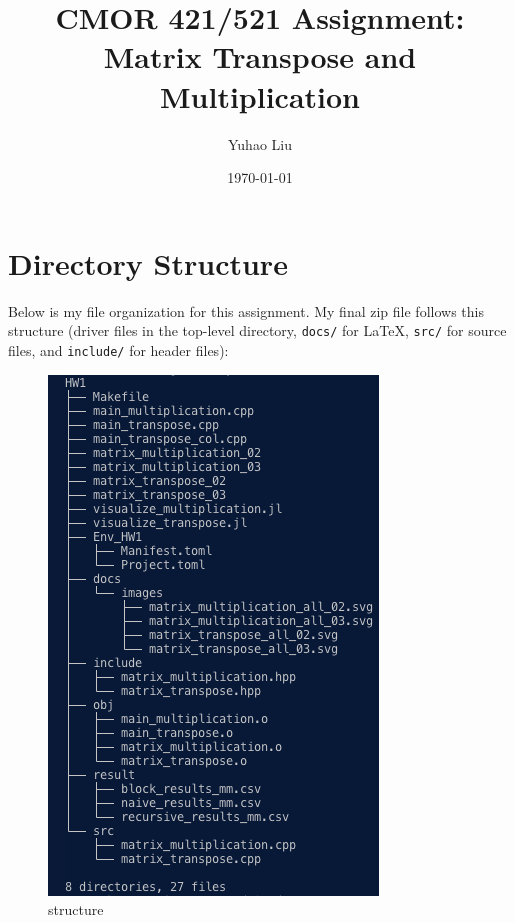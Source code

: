 \documentclass[11pt]{article}
\title{CMOR 421/521 Assignment: Matrix Transpose and Multiplication}
\author{Yuhao Liu}
\date{\today}
\begin{document}
\maketitle

\tableofcontents
\bigskip

\newpage

\section{Directory Structure}
Below is my file organization for this assignment. 
My final zip file follows this structure (driver files in the top-level directory, 
\texttt{docs/} for LaTeX, \texttt{src/} for source files, and \texttt{include/} for header files):

\begin{figure}[H]
    \centering
    \includegraphics[width=0.3\linewidth]{Assignments/HW1/docs/images/structure.png}
    \caption{structure}
    \label{fig:structure}
\end{figure}
\end{document}
